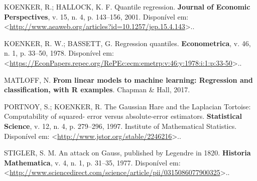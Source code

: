 \documentclass[a4paper, 12pt]{article}
\begin{document}
\leavevmode\hypertarget{ref-qr}{}%
KOENKER, R.; HALLOCK, K. F. Quantile regression. \textbf{Journal of
Economic Perspectives}, v. 15, n. 4, p. 143--156, 2001. Disponível em:
\textless{}\url{http://www.aeaweb.org/articles?id=10.1257/jep.15.4.143}\textgreater{}..

\leavevmode\hypertarget{ref-koenker1978}{}%
KOENKER, R. W.; BASSETT, G. Regression quantiles. \textbf{Econometrica},
v. 46, n. 1, p. 33--50, 1978. Disponível em:
\textless{}\url{https://EconPapers.repec.org/RePEc:ecm:emetrp:v:46:y:1978:i:1:p:33-50}\textgreater{}..

\leavevmode\hypertarget{ref-matloff2017}{}%
MATLOFF, N. \textbf{From linear models to machine learning: Regression
and classification, with R examples}. Chapman \& Hall, 2017.

\leavevmode\hypertarget{ref-tortoise}{}%
PORTNOY, S.; KOENKER, R. The Gaussian Hare and the Laplacian Tortoise:
Computability of squared- error versus absolute-error estimators.
\textbf{Statistical Science}, v. 12, n. 4, p. 279--296, 1997. Institute
of Mathematical Statistics. Disponível em:
\textless{}\url{http://www.jstor.org/stable/2246216}\textgreater{}..

\leavevmode\hypertarget{ref-STIGLER197731}{}%
STIGLER, S. M. An attack on Gauss, published by Legendre in 1820.
\textbf{Historia Mathematica}, v. 4, n. 1, p. 31--35, 1977. Disponível
em:
\textless{}\url{http://www.sciencedirect.com/science/article/pii/0315086077900325}\textgreater{}..
\end{document}
